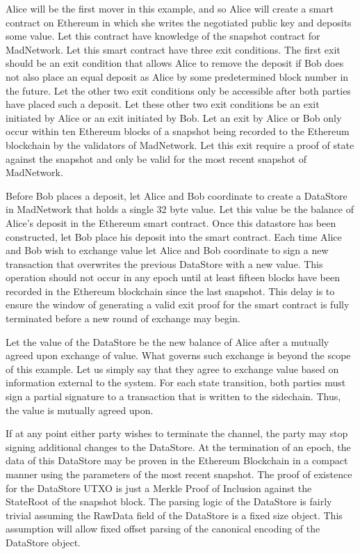 Alice will be the first mover in this example, and so Alice will create
a smart contract on Ethereum in which she writes the negotiated public
key and deposits some value.
Let this contract have knowledge of the snapshot contract for
MadNetwork.
Let this smart contract have three exit conditions.
The first exit should be an exit condition that allows Alice to remove
the deposit if Bob does not also place an equal deposit as Alice by
some predetermined block number in the future.
Let the other two exit conditions only be accessible after both parties
have placed such a deposit.
Let these other two exit conditions be an exit initiated by Alice or an
exit initiated by Bob.
Let an exit by Alice or Bob only occur within ten Ethereum blocks of a
snapshot being recorded to the Ethereum blockchain by the validators of
MadNetwork.
Let this exit require a proof of state against the snapshot and only be
valid for the most recent snapshot of MadNetwork.

Before Bob places a deposit, let Alice and Bob coordinate to create a
DataStore in MadNetwork that holds a single 32 byte value.
Let this value be the balance of Alice’s deposit in the Ethereum
smart contract.
Once this datastore has been constructed, let Bob place his deposit
into the smart contract.
Each time Alice and Bob wish to exchange value let Alice and Bob
coordinate to sign a new transaction that overwrites the previous
DataStore with a new value.
This operation should not occur in any epoch until at least fifteen
blocks have been recorded in the Ethereum blockchain since the last
snapshot.
This delay is to ensure the window of generating a valid exit proof for
the smart contract is fully terminated before a new round of exchange
may begin.

Let the value of the DataStore be the new balance of Alice after a
mutually agreed upon exchange of value.
What governs such exchange is beyond the scope of this example.
Let us simply say that they agree to exchange value based on
information external to the system.
For each state transition, both parties must sign a partial signature
to a transaction that is written to the sidechain.
Thus, the value is mutually agreed upon.

If at any point either party wishes to terminate the channel, the party
may stop signing additional changes to the DataStore.
At the termination of an epoch, the data of this DataStore may be
proven in the Ethereum Blockchain in a compact manner using the
parameters of the most recent snapshot.
The proof of existence for the DataStore UTXO is just a Merkle Proof of
Inclusion against the StateRoot of the snapshot block.
The parsing logic of the DataStore is fairly trivial assuming the
RawData field of the DataStore is a fixed size object.
This assumption will allow fixed offset parsing of the canonical
encoding of the DataStore object.

